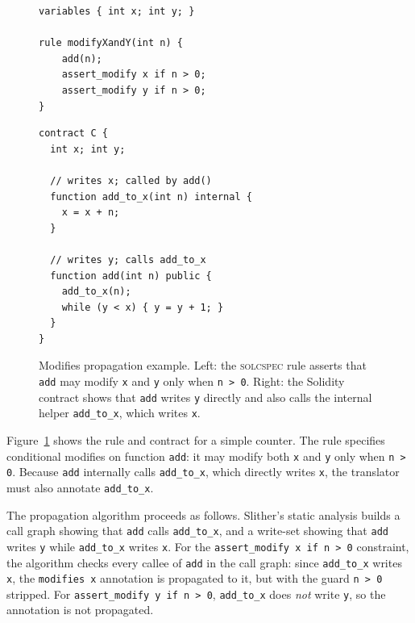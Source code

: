 \begin{figure}[h]
\centering
\begin{minipage}{0.47\textwidth}
\begin{lstlisting}[style=solstyle]
variables { int x; int y; }

rule modifyXandY(int n) {
    add(n);
    assert_modify x if n > 0;
    assert_modify y if n > 0;
}
\end{lstlisting}
\end{minipage}
\hfill
\begin{minipage}{0.47\textwidth}
\begin{lstlisting}[language=Solidity,basicstyle=\small\ttfamily]
contract C {
  int x; int y;

  // writes x; called by add()
  function add_to_x(int n) internal {
    x = x + n;
  }

  // writes y; calls add_to_x
  function add(int n) public {
    add_to_x(n);
    while (y < x) { y = y + 1; }
  }
}
\end{lstlisting}
\end{minipage}
\caption{Modifies propagation example. Left: the \textsc{solcspec} rule asserts that \texttt{add} may modify \texttt{x} and \texttt{y} only when \texttt{n > 0}. Right: the Solidity contract shows that \texttt{add} writes \texttt{y} directly and also calls the internal helper \texttt{add\_to\_x}, which writes \texttt{x}.}
\label{fig:modifies-spec}
\end{figure}

Figure~\ref{fig:modifies-spec} shows the rule and contract for a simple counter. The rule specifies conditional modifies on function \texttt{add}: it may modify both \texttt{x} and \texttt{y} only when \texttt{n > 0}. Because \texttt{add} internally calls \texttt{add\_to\_x}, which directly writes \texttt{x}, the translator must also annotate \texttt{add\_to\_x}.

The propagation algorithm proceeds as follows. Slither's static analysis builds a call graph showing that \texttt{add} calls \texttt{add\_to\_x}, and a write-set showing that \texttt{add} writes \texttt{y} while \texttt{add\_to\_x} writes \texttt{x}. For the \texttt{assert\_modify x if n > 0} constraint, the algorithm checks every callee of \texttt{add} in the call graph: since \texttt{add\_to\_x} writes \texttt{x}, the \texttt{modifies x} annotation is propagated to it, but with the guard \texttt{n > 0} stripped. For \texttt{assert\_modify y if n > 0}, \texttt{add\_to\_x} does \emph{not} write \texttt{y}, so the annotation is not propagated.

